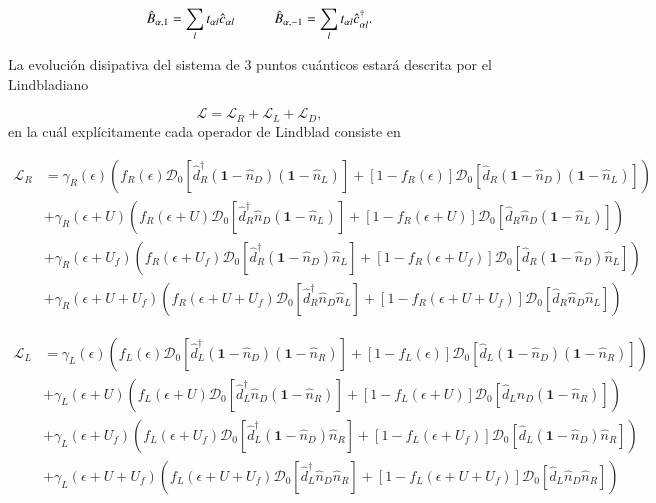 \begin{equation*}
    \hat{B}_{\alpha,1} = \sum_{l}t_{\alpha l} \hat{c}_{\alpha l} \hspace{10mm} \hat{B}_{\alpha,-1} = \sum_{l}t_{\alpha l} \hat{c}^{\dagger}_{\alpha l}.
\end{equation*}

La evolución disipativa del sistema de 3 puntos cuánticos estará descrita por el Lindbladiano 

\begin{equation}
    \mathcal{L} = \mathcal{L}_{R} + \mathcal{L}_{L} + \mathcal{L}_{D},
    \label{Lindbladsec5}
\end{equation}
en la cuál explícitamente cada operador de Lindblad consiste en

\begin{align*}
    \mathcal{L}_{R} & = \gamma_{R}(\epsilon)(f_{R}(\epsilon)\mathcal{D}_{0}[\hat{d}^{\dagger}_{R}(\textbf{1}-\hat{n}_{D})(\textbf{1}-\hat{n}_{L}) ]  + [1-f_{R}(\epsilon)]\mathcal{D}_{0}[\hat{d}_{R}(\textbf{1}-\hat{n}_{D})(\textbf{1}-\hat{n}_{L}) ]  )  \\
                    & + \gamma_{R}(\epsilon+U)(f_{R}(\epsilon+U)\mathcal{D}_{0}[\hat{d}^{\dagger}_{R}\hat{n}_{D}(\textbf{1}-\hat{n}_{L}) ]  + [1-f_{R}(\epsilon+U)]\mathcal{D}_{0}[\hat{d}_{R}\hat{n}_{D}(\textbf{1}-\hat{n}_{L}) ]  ) \\
                   & + \gamma_{R}(\epsilon+U_{f})(f_{R}(\epsilon+U_{f})\mathcal{D}_{0}[\hat{d}^{\dagger}_{R}(\textbf{1}-\hat{n}_{D})\hat{n}_{L} ]  + [1-f_{R}(\epsilon+U_{f})]\mathcal{D}_{0}[\hat{d}_{R}(\textbf{1}-\hat{n}_{D})\hat{n}_{L} ]  ) \\
                  & + \gamma_{R}(\epsilon+U+U_{f})(f_{R}(\epsilon+U+U_{f})\mathcal{D}_{0}[\hat{d}^{\dagger}_{R}\hat{n}_{D}\hat{n}_{L} ]  + [1-f_{R}(\epsilon+U+U_{f})]\mathcal{D}_{0}[\hat{d}_{R}\hat{n}_{D}\hat{n}_{L} ]  ) 
\end{align*}

\begin{align*}
    \mathcal{L}_{L} & = \gamma_{L}(\epsilon)(f_{L}(\epsilon)\mathcal{D}_{0}[\hat{d}^{\dagger}_{L}(\textbf{1}-\hat{n}_{D})(\textbf{1}-\hat{n}_{R}) ]  + [1-f_{L}(\epsilon)]\mathcal{D}_{0}[\hat{d}_{L}(\textbf{1}-\hat{n}_{D})(\textbf{1}-\hat{n}_{R}) ]  )  \\
                    & + \gamma_{L}(\epsilon+U)(f_{L}(\epsilon+U)\mathcal{D}_{0}[\hat{d}^{\dagger}_{L}\hat{n}_{D}(\textbf{1}-\hat{n}_{R}) ]  + [1-f_{L}(\epsilon+U)]\mathcal{D}_{0}[\hat{d}_{L}\hat{n}_{D}(\textbf{1}-\hat{n}_{R}) ]  ) \\
                   & + \gamma_{L}(\epsilon+U_{f})(f_{L}(\epsilon+U_{f})\mathcal{D}_{0}[\hat{d}^{\dagger}_{L}(\textbf{1}-\hat{n}_{D})\hat{n}_{R} ]  + [1-f_{L}(\epsilon+U_{f})]\mathcal{D}_{0}[\hat{d}_{L}(\textbf{1}-\hat{n}_{D})\hat{n}_{R} ]  ) \\
                  & + \gamma_{L}(\epsilon+U+U_{f})(f_{L}(\epsilon+U+U_{f})\mathcal{D}_{0}[\hat{d}^{\dagger}_{L}\hat{n}_{D}\hat{n}_{R} ]  + [1-f_{L}(\epsilon+U+U_{f})]\mathcal{D}_{0}[\hat{d}_{L}\hat{n}_{D}\hat{n}_{R} ]  ) 
\end{align*}

